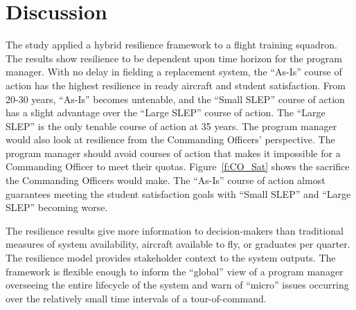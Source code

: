 \documentclass[preprint,12pt]{elsarticle}
\begin{document}
\section{Discussion}
\label{s:Disc}


The study applied a hybrid resilience framework to a flight training
squadron. The results show resilience to be dependent upon time horizon for the
program manager. With no delay in fielding a replacement system, the
``As-Is'' course of action has the highest resilience in ready
aircraft and student satisfaction. From 20-30 years, ``As-Is'' becomes
untenable, and the ``Small SLEP'' course of action has a slight
advantage over the ``Large SLEP'' course of action. The
``Large SLEP'' is the only tenable course of action at 35 years. The
program manager would also look at resilience from the Commanding
Officers' perspective. The program manager should avoid courses of action that makes it impossible for
a Commanding Officer to meet their quotas. Figure~\ref{f:CO_Sat} shows
the sacrifice the Commanding Officers would make. The ``As-Is'' course
of action almost guarantees meeting the student satisfaction goals
with ``Small SLEP'' and ``Large SLEP'' becoming worse.

The resilience results give more information to decision-makers than
traditional measures of system availability, aircraft available to
fly, or graduates per quarter. The resilience model provides
stakeholder context to the system outputs. The framework is flexible
enough to inform the ``global'' view of a program manager overseeing
the entire lifecycle of the system and warn of ``micro'' issues
occurring over the relatively small time intervals of a
tour-of-command. 


\end{document}
